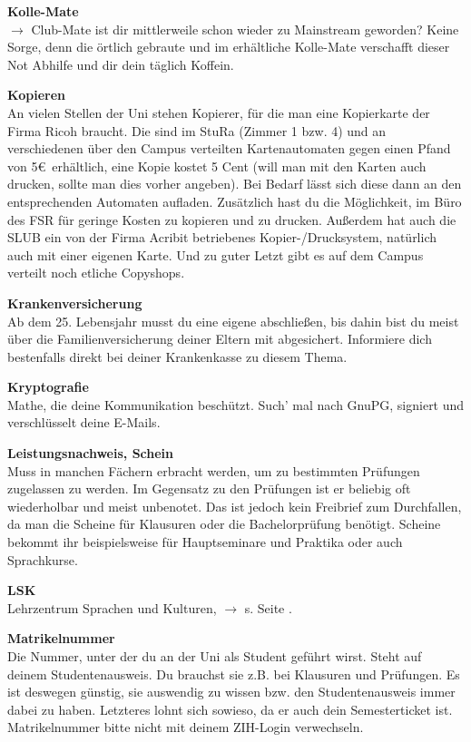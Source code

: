 \begin{multicols}{2}
\vfill\columnbreak

\textbf{Kolle-Mate}\\
$\rightarrow$ Club-Mate ist dir mittlerweile schon wieder zu Mainstream geworden? Keine Sorge, denn die örtlich gebraute und im \ascii{} erhältliche Kolle-Mate verschafft dieser Not Abhilfe und dir dein täglich Koffein.

\textbf{Kopieren} \\
An vielen Stellen der Uni stehen Kopierer, für die man eine Kopierkarte der Firma Ricoh braucht. Die sind im StuRa (Zimmer 1 bzw. 4) und an verschiedenen über den Campus verteilten Kartenautomaten gegen einen Pfand von 5\euro\ erhältlich, eine Kopie kostet 5 Cent (will man mit den Karten auch drucken, sollte man dies vorher angeben).
Bei Bedarf lässt sich diese dann an den entsprechenden Automaten aufladen.
Zusätzlich hast du die Möglichkeit, im Büro des FSR für geringe Kosten zu kopieren und zu drucken.
Außerdem hat auch die SLUB ein von der Firma Acribit betriebenes Kopier-/Drucksystem, natürlich auch mit einer eigenen Karte.
Und zu guter Letzt gibt es auf dem Campus verteilt noch etliche Copyshops.

\textbf{Krankenversicherung} \\
Ab dem 25. Lebensjahr musst du eine eigene abschließen, bis dahin bist du meist über die Familienversicherung deiner Eltern mit abgesichert.
Informiere dich bestenfalls direkt bei deiner Krankenkasse zu diesem Thema.

\textbf{Kryptografie} \\
Mathe, die deine Kommunikation beschützt.
Such' mal nach GnuPG, signiert und verschlüsselt deine E-Mails.

\vfill\columnbreak

\textbf{Leistungsnachweis, Schein} \\
Muss in manchen Fächern erbracht werden, um zu bestimmten Prüfungen zugelassen zu werden.
Im Gegensatz zu den Prüfungen ist er beliebig oft wiederholbar und meist unbenotet.
Das ist jedoch kein Freibrief zum Durchfallen, da man die Scheine für Klausuren oder die Bachelorprüfung benötigt.
Scheine bekommt ihr beispielsweise für Hauptseminare und Praktika oder auch Sprachkurse.

\textbf{LSK} \\
Lehrzentrum Sprachen und Kulturen, $\rightarrow$ s. Seite \pageref{sec:sprachausbildung}.

\textbf{Matrikelnummer} \\
Die Nummer, unter der du an der Uni als Student geführt wirst.
Steht auf deinem Studentenausweis.
Du brauchst sie z.B. bei Klausuren und Prüfungen.
Es ist deswegen günstig, sie auswendig zu wissen bzw. den Studentenausweis immer dabei zu haben.
Letzteres lohnt sich sowieso, da er auch dein Semesterticket ist.
Matrikelnummer bitte nicht mit deinem ZIH-Login verwechseln.


\end{multicols}
